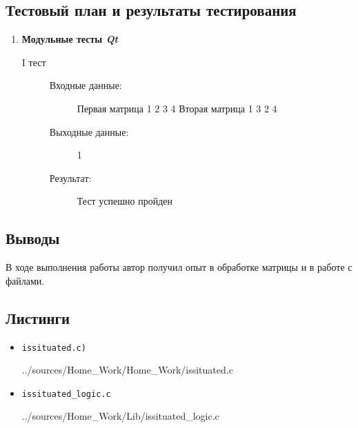 \documentclass[12pt,a4paper]{report}
\begin{document}
\subsection{Тестовый план и результаты тестирования}
\hspace{\parindent}
\begin{enumerate}
\item \textbf{Модульные тесты \textit{Qt}}

\begin{description}
\item[I тест]
\hspace{\parindent}
\begin{flushleft}
\begin{description}
\item[Входные данные:]

\hspace{\parindent}
\begin{flushleft}
Первая матрица
1 2
3 4
Вторая матрица
1 3
2 4
\end{flushleft}

\item[Выходные данные:] 1
\item[Результат:] Тест успешно пройден
\end{description}
\end{flushleft}
\end{description}
\end{enumerate}

\subsection{Выводы}
\hspace{\parindent}
В ходе выполнения работы автор получил опыт в обработке матрицы и в работе с файлами.
\subsection*{Листинги}
\begin{itemize}
\item[] \verb-issituated.c)-

{../sources/Home_Work/Home_Work/issituated.c}

\item[] \verb-issituated_logic.c-

{../sources/Home_Work/Lib/issituated_logic.c}
\end{itemize}
\end{document}
